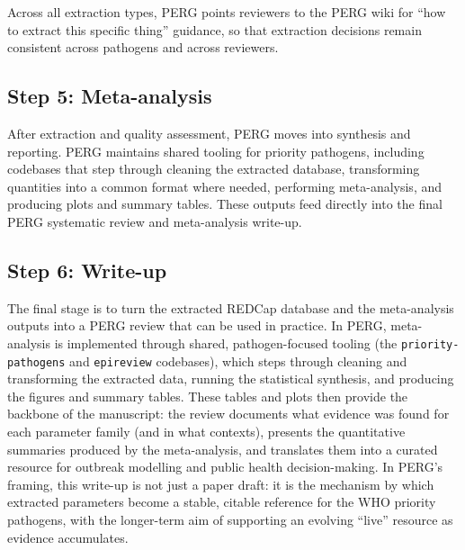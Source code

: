 Across all extraction types, PERG points reviewers to the PERG wiki for “how to extract this specific thing” guidance, so that extraction decisions remain consistent across pathogens and across reviewers.


\subsection*{Step 5: Meta-analysis}
After extraction and quality assessment, PERG moves into synthesis and reporting. PERG maintains shared tooling for priority pathogens, including codebases that step through cleaning the extracted database, transforming quantities into a common format where needed, performing meta-analysis, and producing plots and summary tables. These outputs feed directly into the final PERG systematic review and meta-analysis write-up.

\subsection*{Step 6: Write-up}
The final stage is to turn the extracted REDCap database and the meta-analysis outputs into a PERG review that can be used in practice. In PERG, meta-analysis is implemented through shared, pathogen-focused tooling (the \texttt{priority-pathogens} and \texttt{epireview} codebases), which steps through cleaning and transforming the extracted data, running the statistical synthesis, and producing the figures and summary tables. These tables and plots then provide the backbone of the manuscript: the review documents what evidence was found for each parameter family (and in what contexts), presents the quantitative summaries produced by the meta-analysis, and translates them into a curated resource for outbreak modelling and public health decision-making. In PERG’s framing, this write-up is not just a paper draft: it is the mechanism by which extracted parameters become a stable, citable reference for the WHO priority pathogens, with the longer-term aim of supporting an evolving “live” resource as evidence accumulates.


